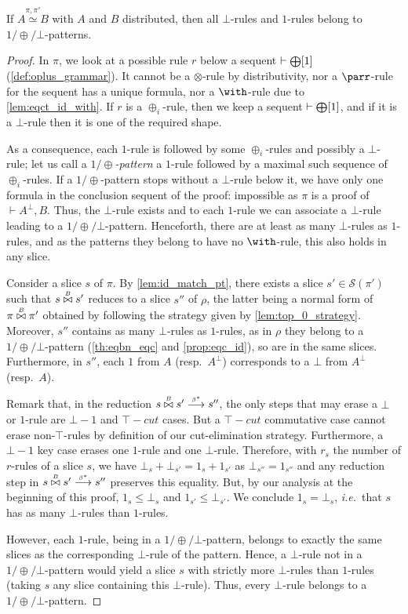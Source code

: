 \documentclass{lmcs}
\newcommand*{\orth}{^\perp} %
\newcommand*{\tens}{\otimes} %
\renewcommand*{\fCenter}{\vdash} %
\newcommand*{\ie}{\emph{i.e.}}
\newcommand*{\resp}{resp.}
\newcommand*{\Slices}{\mathcal{S}}
\newcommand*{\iso}{\mathrel{\simeq}} %
\newcommand{\symboltext}[2]{\mathrel{\overset{\makebox[0pt]{\mbox{\normalfont\tiny\sffamily \ensuremath{#1}}}}{#2}}} %
\newcommand{\betatostar}{\symboltext{\beta^*}{\longrightarrow}}
\newcommand*{\pcontext}[1]{\resizebox{!}{7pt}{$\bigoplus$}[#1]}
\newcommand*{\cutf}[3]{\ensuremath{#1\symboltext{#3}{\bowtie} #2}}
\newcommand{\isoproofs}[4]{\overset{\ensuremath{#3,#4}}{#1\iso #2}}
\begin{document}
\begin{lem}
\label{lem:eqct_id_bot}
If $\isoproofs{A}{B}{\pi}{\pi'}$ with $A$ and $B$ distributed, then all $\bot$-rules and $1$-rules belong to $1/\oplus/\bot$-patterns.
\end{lem}
\begin{proof}
In $\pi$, we look at a possible rule $r$ below a sequent $\fCenter \pcontext{1}$ (\autoref{def:oplus_grammar}).
It cannot be a $\tens$-rule by distributivity, nor a $\parr$-rule for the sequent has a unique formula, nor a $\with$-rule due to \autoref{lem:eqct_id_with}.
If $r$ is a $\oplus_i$-rule, then we keep a sequent $\fCenter \pcontext{1}$, and if it is a $\bot$-rule then it is one of the required shape.

As a consequence, each $1$-rule is followed by some $\oplus_i$-rules and possibly a $\bot$-rule; let us call a \emph{$1/\oplus$-pattern} a $1$-rule followed by a maximal such sequence of $\oplus_i$-rules.
If a $1/\oplus$-pattern stops without a $\bot$-rule below it, we have only one formula in the conclusion sequent of the proof: impossible as $\pi$ is a proof of $\fCenter A\orth,B$.
Thus, the $\bot$-rule exists and to each $1$-rule we can associate a $\bot$-rule leading to a $1/\oplus/\bot$-pattern.
Henceforth, there are at least as many $\bot$-rules as $1$-rules, and as the patterns they belong to have no $\with$-rule, this also holds in any slice.

Consider a slice $s$ of $\pi$.
By \autoref{lem:id_match_pt}, there exists a slice $s'\in\Slices(\pi')$ such that $\cutf{s}{s'}{B}$ reduces to a slice $s''$ of $\rho$, the latter being a normal form of $\cutf{\pi}{\pi'}{B}$ obtained by following the strategy given by \autoref{lem:top_0_strategy}.
Moreover, $s''$ contains as many $\bot$-rules as $1$-rules, as in $\rho$ they belong to a $1/\oplus/\bot$-pattern (\autoref{th:eqbn_eqc} and \autoref{prop:eqc_id}), so are in the same slices.
Furthermore, in $s''$, each $1$ from $A$ (\resp\ $A\orth$) corresponds to a $\bot$ from $A\orth$ (\resp\ $A$).

Remark that, in the reduction $\cutf{s}{s'}{B}\betatostar s''$, the only steps that may erase a $\bot$ or $1$-rule are $\bot-1$ and $\top-cut$ cases.
But a $\top-cut$ commutative case cannot erase non-$\top$-rules by definition of our cut-elimination strategy.
Furthermore, a $\bot-1$ key case erases one $1$-rule and one $\bot$-rule.
Therefore, with $r_s$ the number of $r$-rules of a slice $s$, we have $\bot_s + \bot_{s'} = 1_s + 1_{s'}$ as $\bot_{s''} = 1_{s''}$ and any reduction step in $\cutf{s}{s'}{B}\betatostar s''$ preserves this equality.
But, by our analysis at the beginning of this proof, $1_s \leq \bot_s$ and $1_{s'} \leq \bot_{s'}$.
We conclude $1_s = \bot_s$, \ie\ that $s$ has as many $\bot$-rules than $1$-rules.

However, each $1$-rule, being in a $1/\oplus/\bot$-pattern, belongs to exactly the same slices as the corresponding $\bot$-rule of the pattern.
Hence, a $\bot$-rule not in a $1/\oplus/\bot$-pattern would yield a slice $s$ with strictly more $\bot$-rules than $1$-rules (taking $s$ any slice containing this $\bot$-rule).
Thus, every $\bot$-rule belongs to a $1/\oplus/\bot$-pattern.
\end{proof}
\end{document}
